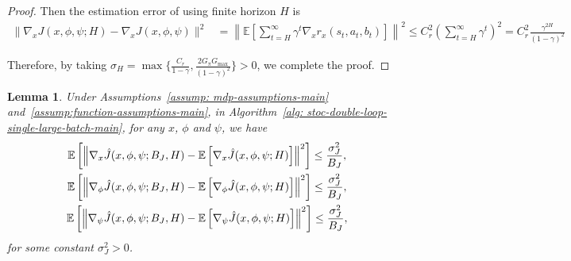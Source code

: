 \documentclass{article}
\theoremstyle{plain}
\newtheorem{lemma}{Lemma}
\theoremstyle{definition}
\theoremstyle{remark}
\def\E{\mathbb E}
\begin{document}
\begin{proof}
    Then the estimation error of using finite horizon $H$ is 
    \begin{align}
         \|\nabla_x J(x,\phi,\psi;H) - \nabla_x J(x,\phi,\psi) \|^2  & = \left\| \E \left[ \sum_{t=H}^\infty \gamma^t \nabla_x r_x(s_t,a_t,b_t)\right] \right\|^2 \leq C_r^2 \left(\sum_{t=H}^{\infty} \gamma^{t} \right)^2 = C_r^2 \frac{\gamma^{2H}}{(1-\gamma)^2}
    \end{align}
    
    Therefore, by taking $\sigma_H  = \max\{\frac{C_r}{1-\gamma}, \frac{2 G_\pi G_{\max}}{(1-\gamma)^2} \} >0$, we complete the proof.
\end{proof}


\begin{lemma}
    \label{lemma: variance-of-J}
    Under Assumptions~\ref{assump: mdp-assumptions-main} and~\ref{assump:function-assumptions-main}, in Algorithm~\ref{alg: stoc-double-loop-single-large-batch-main}, for any $x$, $\phi$ and $\psi$, we have
    \begin{gather}
        \E \left[ \left\| \nabla_x \hat{J}(x,\phi,\psi;B_J,H) - \E \left[ \nabla_x \hat{J}(x,\phi,\psi;H) \right]\right\|^2 \right] \leq \frac{\sigma_J^2}{B_J}, \notag \\
        \E \left[ \left\| \nabla_\phi \hat{J}(x,\phi,\psi;B_J,H) - \E \left[ \nabla_\phi \hat{J}(x,\phi,\psi;H) \right]\right\|^2 \right] \leq \frac{\sigma_J^2}{B_J} ,\notag \\
        \E \left[ \left\| \nabla_\psi \hat{J}(x,\phi,\psi;B_J,H) - \E \left[ \nabla_\psi \hat{J}(x,\phi,\psi;H) \right]\right\|^2 \right] \leq \frac{\sigma_J^2}{B_J}, \notag
    \end{gather}
    for some constant $\sigma_J^2 >0$.
\end{lemma}
\end{document}
